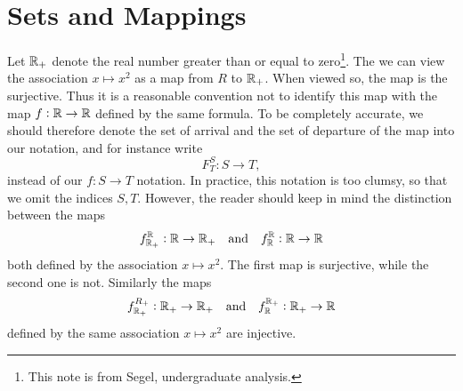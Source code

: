 \section{Sets and Mappings}

\begin{remark}
	Let $\mathbb{R}_+$ denote the real number greater than or equal to zero\footnote{This note is from Segel, undergraduate analysis.}. The we can view the association $x \mapsto x^2$ as a map from $R$ to $\mathbb{R}_+$. When viewed so, the map is the surjective. Thus it is a reasonable convention not to identify this map with the map $f:\mathbb{R} \to \mathbb{R}$ defined by the same formula. To be completely accurate, we should therefore denote the set of arrival and the set of departure of the map into our notation, and for instance write
	\[ F^S_T: S \to T, \]
	instead of our $f: S \to T$ notation. In practice, this notation is too clumsy, so that we omit the indices $S, T.$ However, the reader should keep in mind the distinction between the maps 
	\[ f^{\mathbb{R}}_{\mathbb{R}_+}: \mathbb{R} \to \mathbb{R}_+ \quad \text{and} \quad f_{\mathbb{R}}^{\mathbb{R}}: \mathbb{R} \to \mathbb{R}  \]
	both defined by the association $x \mapsto x^2$. The first map is surjective, while the second one is not. Similarly the maps
	\[ f_{\mathbb{R}_+}^{R_+}: \mathbb{R}_+ \to \mathbb{R}_+ \quad \text{and} \quad f_{\mathbb{R}}^{\mathbb{R}_+}: \mathbb{R}_+ \to \mathbb{R} \]
	defined by the same association $x \mapsto x^2$ are injective.
\end{remark}

\begin{remark}

\end{remark}